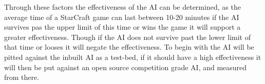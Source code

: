 \documentclass[journal]{IEEEtran}
\begin{document}
Through these factors the effectiveness of the AI can be determined, as the average time of a StarCraft game can last between 10-20 minutes if the AI survives pas the upper limit of this time or wins the game it will support a greater effectiveness. Though if the AI does not survive past the lower limit of that time or looses it will negate the effectiveness. To begin with the AI will be pitted against the inbuilt AI as a test-bed, if it should have a high effectiveness it will then be put against an open source competition grade AI, and measured from there.








\end{document}
